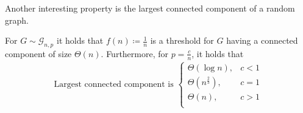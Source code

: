 Another interesting property is the largest connected component of a random graph.
\begin{theorem}
    For $G \sim \mathcal{G}_{n,p}$ it holds that $f(n) \coloneqq \frac{1}{n}$ is a threshold for
    $G$ having a connected component of size $\Theta(n)$.
    Furthermore, for $p = \frac{c}{n}$, it holds that
    \begin{align*}
        \text{Largest connected component is } \begin{cases}
                                                   \Theta(\log n)          , & c < 1 \\
                                                   \Theta(n^{\frac{2}{3}}) , & c = 1 \\
                                                   \Theta(n)               , & c > 1 \\
                                               \end{cases}
    \end{align*}
\end{theorem}